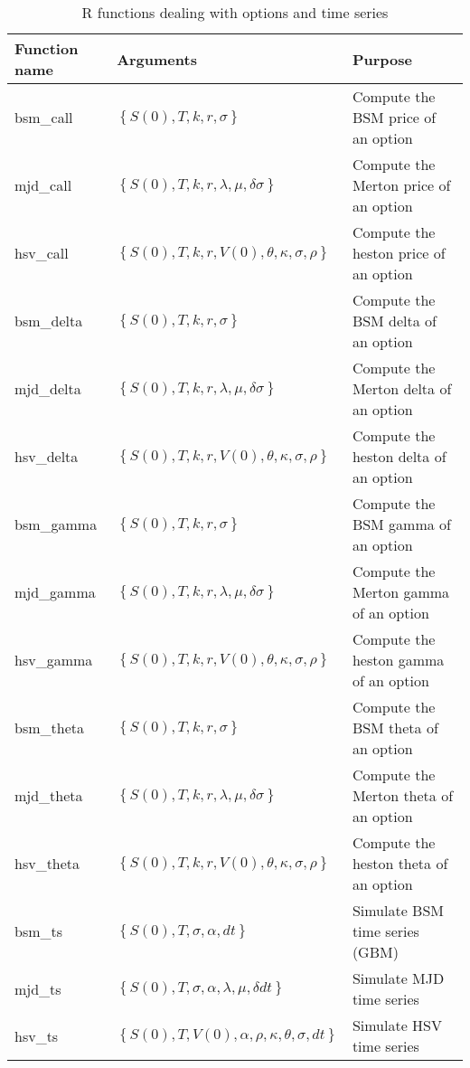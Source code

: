 \documentclass[a4paper, 12pt]{report}
\begin{document}
\begin{appendices}
\begin{table}[ht]
  \begin{tabularx}{\textwidth}{llX}
    \hline
    Function name & Arguments & Purpose \\
    \hline
    bsm\_call & $\left \{ S(0), T, k, r, \sigma \right \}$ & Compute the BSM price of an option \\
    mjd\_call & $\left \{ S(0), T, k, r, \lambda, \mu, \delta \sigma \right \}$ & Compute the Merton price of an option \\
    hsv\_call & $\left \{ S(0), T, k, r, V(0), \theta, \kappa, \sigma, \rho \right \}$ & Compute the heston price of an option \\
    bsm\_delta & $\left \{ S(0), T, k, r, \sigma \right \}$ & Compute the BSM delta of an option \\
    mjd\_delta & $\left \{ S(0), T, k, r, \lambda, \mu, \delta \sigma \right \}$ & Compute the Merton delta of an option \\
    hsv\_delta & $\left \{ S(0), T, k, r, V(0), \theta, \kappa, \sigma, \rho \right \}$ & Compute the heston delta of an option \\
    bsm\_gamma & $\left \{ S(0), T, k, r, \sigma \right \}$ & Compute the BSM gamma of an option \\
    mjd\_gamma & $\left \{ S(0), T, k, r, \lambda, \mu, \delta \sigma \right \}$ & Compute the Merton gamma of an option \\
    hsv\_gamma & $\left \{ S(0), T, k, r, V(0), \theta, \kappa, \sigma, \rho \right \}$ & Compute the heston gamma of an option \\
    bsm\_theta & $\left \{ S(0), T, k, r, \sigma \right \}$ & Compute the BSM theta of an option \\
    mjd\_theta & $\left \{ S(0), T, k, r, \lambda, \mu, \delta \sigma \right \}$ & Compute the Merton theta of an option \\
    hsv\_theta & $\left \{ S(0), T, k, r, V(0), \theta, \kappa, \sigma, \rho \right \}$ & Compute the heston theta of an option \\
    bsm\_ts & $\left \{ S(0), T, \sigma, \alpha, dt \right \}$ & Simulate BSM time series (GBM) \\
    mjd\_ts & $\left \{ S(0), T, \sigma, \alpha, \lambda, \mu, \delta dt \right \}$ & Simulate MJD time series \\
    hsv\_ts & $\left \{ S(0), T, V(0), \alpha, \rho, \kappa, \theta, \sigma, dt \right \}$ & Simulate HSV time series \\
  \end{tabularx}
  \caption{R functions dealing with options and time series}
  \label{t:append:function:r}
\end{table}


\end{appendices}
\end{document}
